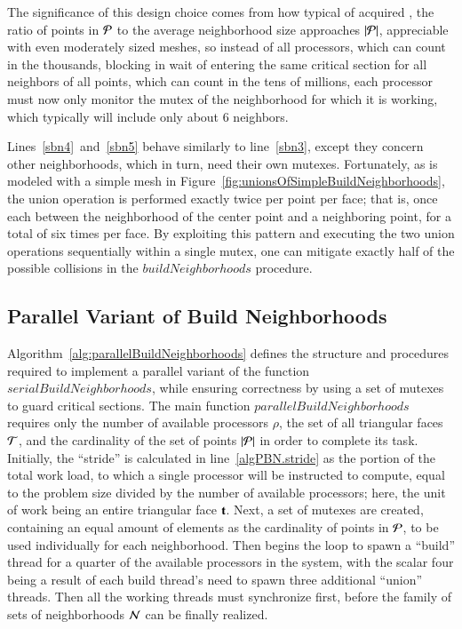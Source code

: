 The significance of this design choice comes from how typical of acquired \tdd{}, the ratio of points in $\mathcal{P}$ to the average neighborhood size approaches $|\mathcal{P}|$, appreciable with even moderately sized meshes, so instead of all processors, which can count in the thousands, blocking in wait of entering the same critical section for all neighbors of all points, which can count in the tens of millions, each processor must now only monitor the mutex of the neighborhood for which it is working, which typically will include only about 6 neighbors.

Lines~\ref{sbn4}~and~\ref{sbn5} behave similarly to line~\ref{sbn3}, except they concern other neighborhoods, which in turn, need their own mutexes. Fortunately, as is modeled with a simple mesh in Figure~\ref{fig:unionsOfSimpleBuildNeighborhoods}, the union operation is performed exactly twice per point per face; that is, once each between the neighborhood of the center point and a neighboring point, for a total of six times per face. By exploiting this pattern and executing the two union operations sequentially within a single mutex, one can mitigate exactly half of the possible collisions in the $\mathit{buildNeighborhoods}$ procedure.

%
%
\subsection{Parallel Variant of Build Neighborhoods}
\label{ch6sBNPssPVBN}
Algorithm~\ref{alg:parallelBuildNeighborhoods} defines the structure and procedures required to implement a parallel variant of the function $\mathit{serialBuildNeighborhoods}$, while ensuring correctness by using a set of mutexes to guard critical sections. The main function $\mathit{parallelBuildNeighborhoods}$ requires only the number of available processors $\rho$, the set of all triangular faces $\mathcal{T}$, and the cardinality of the set of points $|\mathcal{P}|$ in order to complete its task. Initially, the ``stride'' is calculated in line~\ref{algPBN.stride} as the portion of the total work load, to which a single processor will be instructed to compute, equal to the problem size divided by the number of available processors; here, the unit of work being an entire triangular face $\mathbf{t}$. Next, a set of mutexes are created, containing an equal amount of elements as the cardinality of points in $\mathcal{P}$, to be used individually for each neighborhood.  Then begins the loop to spawn a ``build'' thread for a quarter of the available processors in the system, with the scalar four being a result of each build thread's need to spawn three additional ``union'' threads. Then all the working threads must synchronize first, before the family of sets of neighborhoods $\mathcal{N}$ can be finally realized.

